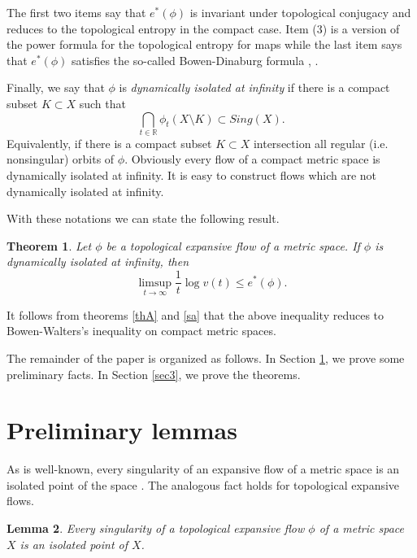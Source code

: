 \documentclass[11pt,letterpaper]{amsart}
\newtheorem{thm}{Theorem}%
\newtheorem{lemma}[thm]{Lemma}
\begin{document}
The first two items say that $e^*(\phi)$ is invariant under topological conjugacy and reduces to the topological entropy in the compact case.
Item (3) is a version of the power formula for the topological entropy for maps
while the last item says that $e^*(\phi)$ satisfies the so-called Bowen-Dinaburg formula
\cite{b}, \cite{di}.

Finally, we say that $\phi$ is {\em dynamically isolated at infinity} if there is a compact subset $K\subset X$ such that
$$
\bigcap_{t\in\mathbb{R}}\phi_t(X\setminus K)\subset Sing(X).
$$
Equivalently, if there is a compact subset $K\subset X$ intersection all regular (i.e. nonsingular) orbits of $\phi$. Obviously every flow of a compact metric space is dynamically isolated at infinity. It is easy to construct flows which are not dynamically isolated at infinity.

With these notations we can state the following result.

\begin{thm}
\label{thB}
Let $\phi$ be a topological expansive flow of a metric space.
If $\phi$ is dynamically isolated at infinity, then
$$
\limsup_{t \to \infty} \frac{1}{t} \log v(t) \leq e^*(\phi).
$$
\end{thm}

It follows from theorems \ref{thA} and \ref{sa} that the above inequality reduces to Bowen-Walters's inequality \cite{bw} on compact metric spaces.


The remainder of the paper is organized as follows.
In Section \ref{sec2}, we prove some preliminary facts.
In Section \ref{sec3}, we prove the theorems.














\section{Preliminary lemmas}
\label{sec2}




\noindent
As is well-known, every singularity of an expansive flow of a metric space is an isolated point of the space \cite{bw}.
The analogous fact holds for topological expansive flows.

\begin{lemma}
\label{alacran}
Every singularity of a topological expansive flow $\phi$ of a metric space $X$ is an isolated point of $X$.
\end{lemma}
\end{document}
